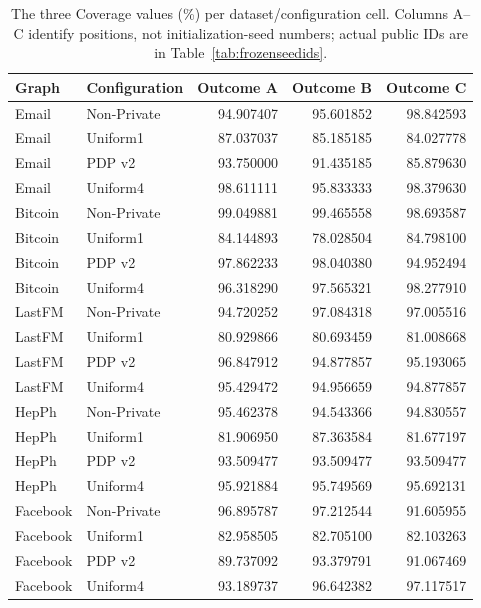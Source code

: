 \begin{table}[htbp]
\centering\small
\caption{The three Coverage values (\%) per dataset/configuration cell. Columns A--C identify positions, not initialization-seed numbers; actual public IDs are in Table~\ref{tab:frozenseedids}.}\label{tab:frozenseeds}
\begin{tabular}{llrrr}
\toprule
Graph & Configuration & Outcome A & Outcome B & Outcome C\\ \midrule
Email & Non-Private & 94.907407 & 95.601852 & 98.842593 \\
Email & Uniform1 & 87.037037 & 85.185185 & 84.027778 \\
Email & PDP v2 & 93.750000 & 91.435185 & 85.879630 \\
Email & Uniform4 & 98.611111 & 95.833333 & 98.379630 \\
Bitcoin & Non-Private & 99.049881 & 99.465558 & 98.693587 \\
Bitcoin & Uniform1 & 84.144893 & 78.028504 & 84.798100 \\
Bitcoin & PDP v2 & 97.862233 & 98.040380 & 94.952494 \\
Bitcoin & Uniform4 & 96.318290 & 97.565321 & 98.277910 \\
LastFM & Non-Private & 94.720252 & 97.084318 & 97.005516 \\
LastFM & Uniform1 & 80.929866 & 80.693459 & 81.008668 \\
LastFM & PDP v2 & 96.847912 & 94.877857 & 95.193065 \\
LastFM & Uniform4 & 95.429472 & 94.956659 & 94.877857 \\
HepPh & Non-Private & 95.462378 & 94.543366 & 94.830557 \\
HepPh & Uniform1 & 81.906950 & 87.363584 & 81.677197 \\
HepPh & PDP v2 & 93.509477 & 93.509477 & 93.509477 \\
HepPh & Uniform4 & 95.921884 & 95.749569 & 95.692131 \\
Facebook & Non-Private & 96.895787 & 97.212544 & 91.605955 \\
Facebook & Uniform1 & 82.958505 & 82.705100 & 82.103263 \\
Facebook & PDP v2 & 89.737092 & 93.379791 & 91.067469 \\
Facebook & Uniform4 & 93.189737 & 96.642382 & 97.117517 \\
\bottomrule\end{tabular}
\end{table}

